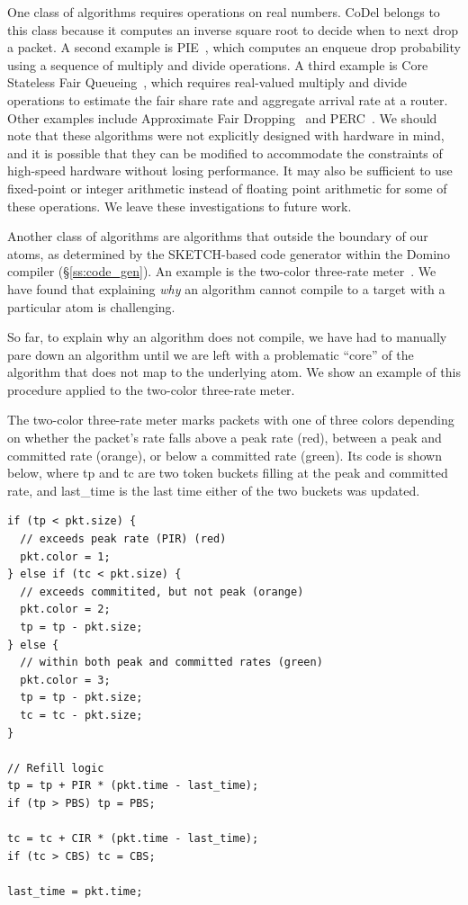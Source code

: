 One class of algorithms requires operations on real numbers.  CoDel belongs to
this class because it computes an inverse square root to decide when to next
drop a packet. A second example is PIE~\cite{pie}, which computes an enqueue
drop probability using a sequence of multiply and divide operations. A third
example is Core Stateless Fair Queueing~\cite{csfq}, which requires real-valued
multiply and divide operations to estimate the fair share rate and aggregate
arrival rate at a router. Other examples include Approximate Fair
Dropping~\cite{afd} and PERC~\cite{perc}. We should note that these algorithms
were not explicitly designed with hardware in mind, and it is possible that
they can be modified to accommodate the constraints of high-speed hardware
without losing performance.  It may also be sufficient to use fixed-point or
integer arithmetic instead of floating point arithmetic for some of these
operations. We leave these investigations to future work.

Another class of algorithms are algorithms that outside the boundary of our
atoms, as determined by the SKETCH-based code generator within the Domino
compiler (\S\ref{ss:code_gen}). An example is the two-color three-rate
meter~\cite{trTCM}. We have found that explaining {\em why} an algorithm cannot
compile to a target with a particular atom is challenging.

So far, to explain why an algorithm does not compile, we have had to manually
pare down an algorithm until we are left with a problematic ``core'' of the
algorithm that does not map to the underlying atom. We show an
example of this procedure applied to the two-color three-rate meter.

The two-color three-rate meter marks packets with one of three colors depending
on whether the packet's rate falls above a peak rate (red), between a peak and
committed rate (orange), or below a committed rate (green). Its code is shown
below, where tp and tc are two token buckets filling at the peak and committed
rate, and last\_time is the last time either of the two buckets was updated.

\begin{verbatim}
if (tp < pkt.size) {
  // exceeds peak rate (PIR) (red)
  pkt.color = 1;
} else if (tc < pkt.size) {
  // exceeds commitited, but not peak (orange)
  pkt.color = 2;
  tp = tp - pkt.size;
} else {
  // within both peak and committed rates (green)
  pkt.color = 3;
  tp = tp - pkt.size;
  tc = tc - pkt.size;
}

// Refill logic
tp = tp + PIR * (pkt.time - last_time);
if (tp > PBS) tp = PBS;

tc = tc + CIR * (pkt.time - last_time);
if (tc > CBS) tc = CBS;

last_time = pkt.time;
\end{verbatim}

